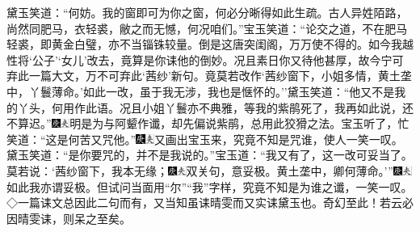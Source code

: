 黛玉笑道：``何妨。我的窗即可为你之窗，何必分晰得如此生疏。古人异姓陌路，尚然同肥马，衣轻裘，敝之而无憾，何况咱们。''宝玉笑道：``论交之道，不在肥马轻裘，即黄金白璧，亦不当锱铢较量。倒是这唐突闺阁，万万使不得的。如今我越性将`公子'`女儿'改去，竟算是你诔他的倒妙。况且素日你又待他甚厚，故今宁可弃此一篇大文，万不可弃此`茜纱'新句。竟莫若改作`茜纱窗下，小姐多情，黄土垄中，丫鬟薄命。'如此一改，虽于我无涉，我也是惬怀的。''黛玉笑道：``他又不是我的丫头，何用作此语。况且小姐丫鬟亦不典雅，等我的紫鹃死了，我再如此说，还不算迟。''{\includegraphics[width=3mm]{../Images/00004}\includegraphics[width=3mm]{../Images/00012}\footnotesize \kaishu 明是为与阿颦作谶，却先偏说紫鹃，总用此狡猾之法。}宝玉听了，忙笑道：``这是何苦又咒他。''{\includegraphics[width=3mm]{../Images/00004}\includegraphics[width=3mm]{../Images/00012}\footnotesize \kaishu 又画出宝玉来，究竟不知是咒谁，使人一笑一叹。}黛玉笑道：``是你要咒的，并不是我说的。''宝玉道：``我又有了，这一改可妥当了。莫若说：`茜纱窗下，我本无缘；{\includegraphics[width=3mm]{../Images/00004}\includegraphics[width=3mm]{../Images/00012}\footnotesize \kaishu 双关句，意妥极。}黄土垄中，卿何薄命。'''{\includegraphics[width=3mm]{../Images/00004}\includegraphics[width=3mm]{../Images/00012}\footnotesize \kaishu 如此我亦谓妥极。但试问当面用``尔''``我''字样，究竟不知是为谁之谶，一笑一叹。◇一篇诔文总因此二句而有，又当知虽诔晴雯而又实诔黛玉也。奇幻至此！若云必因晴雯诔，则呆之至矣。}

